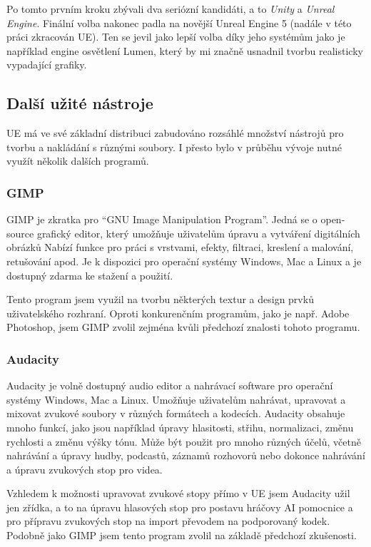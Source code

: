 \documentclass[12pt,a4paper,hidelinks]{article}
\begin{document}
Po tomto prvním kroku zbývali dva seriózní kandidáti, a to \textit{Unity}\cite{unity} a \textit{Unreal Engine}\cite{unreal}. Finální volba nakonec padla na novější Unreal Engine 5 (nadále v této práci zkracován UE). Ten se jevil jako lepší volba díky jeho systémům jako je například engine osvětlení Lumen\cite{uedocs:lumen}, který by mi značně usnadnil tvorbu realisticky vypadající grafiky.

\subsection{Další užité nástroje}
UE má ve své základní distribuci zabudováno rozsáhlé množství nástrojů pro tvorbu a nakládání s různými soubory. I přesto bylo v průběhu vývoje nutné využít několik dalších programů.

\subsubsection{GIMP}
GIMP je zkratka pro \enquote{GNU Image Manipulation Program}\cite{gimp}. Jedná se o open-source grafický editor, který umožňuje uživatelům úpravu a vytváření digitálních obrázků Nabízí funkce pro práci s vrstvami, efekty, filtraci, kreslení a malování, retušování apod. Je k dispozici pro operační systémy Windows, Mac a Linux a je dostupný zdarma ke stažení a použití.

Tento program jsem využil na tvorbu některých textur a design prvků uživatelského rozhraní. Oproti konkurenčním programům, jako je např. Adobe Photoshop\cite{photoshop}, jsem GIMP zvolil zejména kvůli předchozí znalosti tohoto programu.

\subsubsection{Audacity}
Audacity\cite{audacity} je volně dostupný audio editor a nahrávací software pro operační systémy Windows, Mac a Linux. Umožňuje uživatelům nahrávat, upravovat a mixovat zvukové soubory v různých formátech a kodecích. Audacity obsahuje mnoho funkcí, jako jsou například úpravy hlasitosti, střihu, normalizaci, změnu rychlosti a změnu výšky tónu. Může být použit pro mnoho různých účelů, včetně nahrávání a úpravy hudby, podcastů, záznamů rozhovorů nebo dokonce nahrávání a úpravu zvukových stop pro videa.

Vzhledem k možnosti upravovat zvukové stopy přímo v UE jsem Audacity užil jen zřídka, a to na úpravu hlasových stop pro postavu hráčovy AI pomocnice a pro přípravu zvukových stop na import převodem na podporovaný kodek. Podobně jako GIMP jsem tento program zvolil na základě předchozí zkušenosti.
\end{document}
